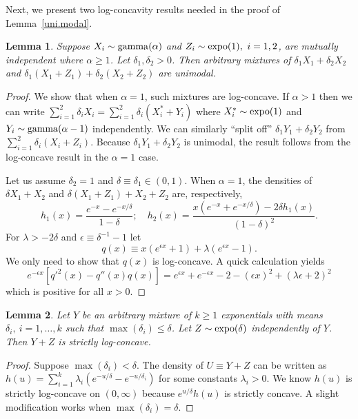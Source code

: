 \documentclass[11pt]{article}
\newtheorem{lemma}{\bf Lemma}
\begin{document}
Next, we present two log-concavity results needed in the proof of Lemma~\ref{uni.modal}.
\begin{lemma}
\label{lem.lc1}
Suppose $X_i\sim {\rm gamma}(\alpha)$ and $Z_i\sim {\rm expo}(1),\ i=1,2$, are mutually independent where $\alpha\geq 1$.  Let $\delta_1, \delta_2 >0$.  Then arbitrary mixtures of $\delta_1 X_1 + \delta_2 X_2$ and $\delta_1 (X_1 + Z_1) + \delta_2(X_2 + Z_2)$ are unimodal. 
\end{lemma}
\begin{proof}
We show that when $\alpha=1$, such mixtures are log-concave.  If $\alpha >1$ then we can write $\sum_{i=1}^2 \delta_i X_i = \sum_{i=1}^2 \delta_i (X_i^*  + Y_i) $ where $X_i^*\sim {\rm expo}(1)$ and $Y_i \sim {\rm gamma}(\alpha -1)$ independently.  We can similarly ``split off'' $\delta_1 Y_1 + \delta_2 Y_2$ from $\sum_{i=1}^2 \delta_i (X_i + Z_i)$.  Because $\delta_1 Y_1 + \delta_2 Y_2$ is unimodal, the result follows from the log-concave result in the $\alpha=1$ case. 

Let us assume $\delta_2=1$ and $\delta\equiv \delta_1\in (0,1)$.  When $\alpha=1$, the densities of $\delta X_1 + X_2$ and $\delta (X_1 +Z_1) + X_2 +Z_2$ are, respectively, 
$$h_1(x) = \frac{e^{-x} - e^{-x/\delta }}{1-\delta}; \quad h_2(x) = \frac{x(e^{-x}+ e^{-x/\delta})-2\delta h_1(x)}{(1-\delta)^2}.$$
For $\lambda > -2\delta$ and $\epsilon \equiv \delta^{-1} -1$ let 
$$q(x)\equiv x(e^{\epsilon x} + 1) +\lambda (e^{\epsilon x}  - 1).$$  
We only need to show that $q(x)$ is log-concave.  A quick calculation yields 
$$e^{-\epsilon x}\left[q'^2(x)  - q''(x) q(x)\right] = e^{\epsilon x} + e^{-\epsilon x} -2 - (\epsilon x)^2 + (\lambda \epsilon + 2)^2 $$
which is positive for all $x>0$.
\end{proof}
\begin{lemma}
\label{lem.lc2}
Let $Y$ be an arbitrary mixture of $k\geq 1$ exponentials with means $\delta_i,\ i=1,\ldots, k$ such that $\max(\delta_i)\leq \delta$.  Let $Z\sim {\rm expo}(\delta)$ independently of $Y$.  Then $Y+Z$ is strictly log-concave. 
\end{lemma}
\begin{proof}
Suppose $\max(\delta_i)<\delta$.  The density of $U\equiv Y+Z$ can be written as 
$h(u) = \sum_{i=1}^k \lambda_i (e^{-u/\delta} - e^{-u/\delta_i}) $ for some constants $\lambda_i>0$.  We know $h(u)$ is strictly log-concave on $(0, \infty)$ because $e^{u/\delta} h(u)$ is strictly concave.  A slight modification works when $\max(\delta_i) =\delta$. 
\end{proof}
\end{document}

